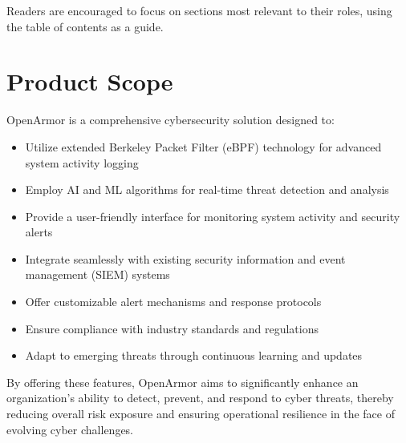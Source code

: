 Readers are encouraged to focus on sections most relevant to their roles, using the table of contents as a guide.

\section{Product Scope}
OpenArmor is a comprehensive cybersecurity solution designed to:

\begin{itemize}
    \item Utilize extended Berkeley Packet Filter (eBPF) technology for advanced system activity logging
    \item Employ AI and ML algorithms for real-time threat detection and analysis
    \item Provide a user-friendly interface for monitoring system activity and security alerts
    \item Integrate seamlessly with existing security information and event management (SIEM) systems
    \item Offer customizable alert mechanisms and response protocols
    \item Ensure compliance with industry standards and regulations
    \item Adapt to emerging threats through continuous learning and updates
\end{itemize}

By offering these features, OpenArmor aims to significantly enhance an organization's ability to detect, prevent, and respond to cyber threats, thereby reducing overall risk exposure and ensuring operational resilience in the face of evolving cyber challenges.